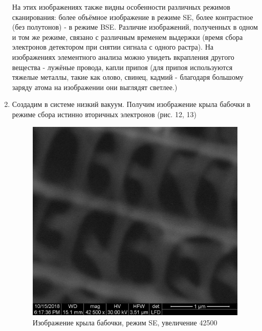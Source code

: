 \documentclass[a4paper]{article}
\begin{document}
\begin{enumerate}
На этих изображениях также видны особенности различных режимов сканирования: более объёмное изображение в режиме SE, более контрастное (без полутонов) - в режиме BSE. Различие изображений, полученных в одном и том же режиме, связано с различным временем выдержки (время сбора электронов детектором при снятии сигнала с одного растра). На изображениях элементного анализа можно увидеть вкрапления другого вещества - лужёные провода, капли припоя (для припоя используются тяжелые металлы, такие как олово, свинец, кадмий - благодаря большому заряду атома на изображении они выглядят светлее.)

\item Создадим в системе низкий вакуум. Получим изображение крыла бабочки в режиме сбора истинно вторичных электронов (рис. 12, 13)

    \begin{figure}[h]
\begin{center}
\begin{minipage}[h]{0.45\linewidth}
\includegraphics[width=1\linewidth]{iv1bab_006.jpg}
\caption{Изображение крыла бабочки, режим SE, увеличение 42500} %
\end{minipage}
\hfill 
\begin{minipage}[h]{0.45\linewidth}

\end{minipage}
\end{center}
\end{figure}
\end{enumerate}
\end{document}
